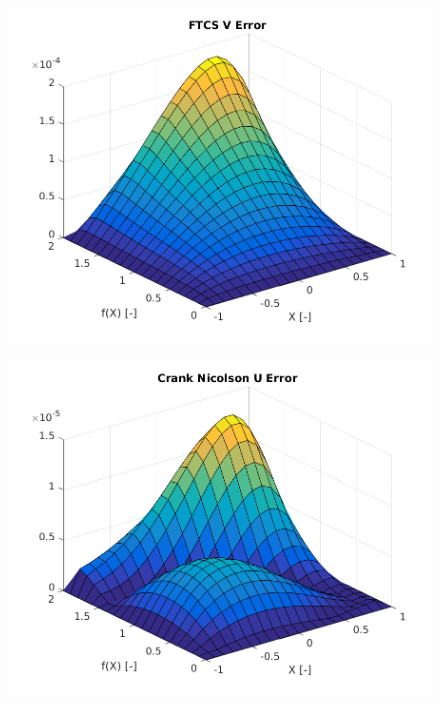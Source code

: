 \documentclass[12pt]{article}
\begin{document}
	\begin{figure}[!htb]
		\centering
		\includegraphics[scale=0.75]{ftcsv.png}
	\end{figure}
	
	\begin{figure}[!htb]
		\centering
		\includegraphics[scale=0.75]{CNu.png}
	\end{figure}
	
\end{document}
